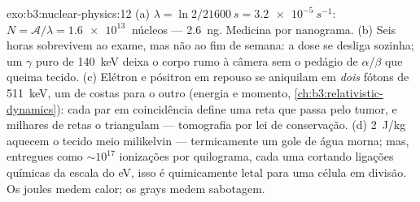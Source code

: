 \begin{solution}{exo:b3:nuclear-physics:12}
(a) $\lambda = \ln2/\qty{21600}{s} = \qty{3.2e-5}{s^{-1}}$:
$N = \mathcal A/\lambda = \qty{1.6e13}{}$ núcleos ---
\qty{2.6}{ng}. Medicina por nanograma. (b) Seis horas sobrevivem
ao exame, mas não ao fim de semana: a dose se desliga sozinha; um
$\gamma$ puro de \qty{140}{keV} deixa o corpo rumo à câmera
sem o pedágio de $\alpha$/$\beta$ que queima tecido. (c) Elétron
e pósitron em repouso se aniquilam em \emph{dois} fótons de
\qty{511}{keV}, um de costas para o outro (energia e momento,
\cref{ch:b3:relativistic-dynamics}): cada par em coincidência
define uma reta que passa pelo tumor, e milhares de retas
o triangulam --- tomografia por lei de conservação. (d)
\qty{2}{J/kg} aquecem o tecido meio milikelvin --- termicamente um
gole de água morna; mas, entregues como ${\sim}10^{17}$ ionizações
por quilograma, cada uma cortando ligações químicas da escala do
\unit{eV}, isso é quimicamente letal para uma célula em divisão. Os
joules medem calor; os grays medem sabotagem.
\end{solution}

